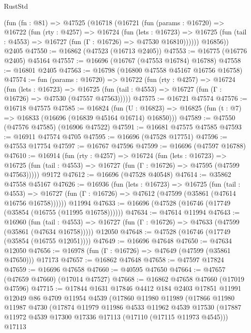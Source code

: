 \begin{lexlean}{RustStd}
\begin{coremodule}
    (fun (fn : @81) =>
    @47525
      (@16718
        (@16721
          (fun (params : @16720) =>
          @16722
            (fun (rty : @4257) =>
            @16724
              (fun (lets : @16723) =>
              @16725 (fun (tail : @4553) => @16727 (fun (Γ : @16726) => @47530 @16810))))))
        @16856))
    @2405
@47550 := @16862 (@47523 (@16713 @2405))
@47553 := @16775 (@16776 @2405) @45164
@47557 := @16696 (@16767 (@47553 @16784) @16788)
@47558 := @16801 @2405
@47563 := @16798 (@16800 @47558 @45167 @16756 @16758)
@47574 := fun (params : @16720) =>
  @16722
    (fun (rty : @4257) =>
    @16724
      (fun (lets : @16723) =>
      @16725 (fun (tail : @4553) => @16727 (fun (Γ : @16726) => @47530 (@47557 @47563)))))
@47575 := @16721 @47574
@47576 := @16718 @47575
@47585 := @16824
    (fun (U : @16823) => @16825 (fun (t : @7) => @16833 (@16696 (@16839 @45164 @16714) @16850)))
@47589 := @47550 (@47576 @47585) (@16906 @47522)
@47591 := @16681 @47575 @47585
@47593 := @16911 @47574 @4705
@47595 := @16696 (@47528 @17751)
@47596 := @47553 @17754
@47597 := @16767 @47596
@47599 := @16696 (@47597 @16788)
@47610 := @16914
    (fun (rty : @4257) =>
    @16724
      (fun (lets : @16723) =>
      @16725 (fun (tail : @4553) => @16727 (fun (Γ : @16726) => @47595 (@47599 @47563)))))
    @9172
@47612 := @16696 (@47528 @40548)
@47614 := @35862 @47558 @45167
@47626 := @16936
    (fun (lets : @16723) =>
    @16725
      (fun (tail : @4553) =>
      @16727 (fun (Γ : @16726) => @47612 (@47599 (@35861 (@47614 @16756 @16758))))))
    @11994
@47633 := @16696 (@47528 (@16746 (@17749 (@35854 (@16755 (@11995 @16758))))))
@47634 := @47614 @11994
@47643 := @16960
    (fun (tail : @4553) => @16727 (fun (Γ : @16726) => @47633 (@47599 (@35861 (@47634 @16758)))))
    @12050
@47648 := @47528 (@16746 (@17749 (@35854 (@16755 @12051))))
@47649 := @16696 @47648
@47650 := @47634 @12050
@47656 := @16978 (fun (Γ : @16726) => @47649 (@47599 (@35861 @47650))) @17173
@47657 := @16862 @47648
@47658 := @47597 @17824
@47659 := @16696 @47658
@47660 := @40595 @47650
@47664 := @47657 (@47659 @47660) (@17014 @47527)
@47668 := @16862 @47658 @47660 (@17019 @47596)
@47715 := @17844
    @1631
    @17846
    @4412
    @184
    @2403
    @17851
    @11991
    @12049
    @86
    @4709
    @11954
    @4539
    (@17860
      @11980
      @11989
      (@17866
        @11980
        @11987
        @4730
        (@17874
          @11979
          @11986
          @4533
          @11962
          @4539
          @17530
          (@17887 @11972 @4539 @17300 @17336 @17113 (@17110 (@17115 @11973 @4545)))
          @17113

\end{coremodule}
\end{lexlean}
